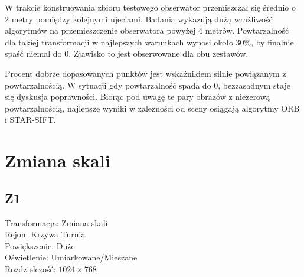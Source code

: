 W trakcie konstruowania zbioru testowego obserwator przemiszczał się średnio o 2 metry pomiędzy kolejnymi ujeciami. Badania wykazują dużą wrażliwość algorytmów na przemieszczenie obserwatora powyżej 4 metrów. Powtarzalność dla takiej transformacji w najlepszych warunkach wynosi około 30\%, by finalnie spaść niemal do 0. Zjawisko to jest obserwowane dla obu zestawów.

Procent dobrze dopasowanych punktów jest wskaźnikiem silnie powiązanym z powtarzalnością. W sytuacji gdy powtarzalność spada do 0, bezzasadnym staje się dyskusja poprawności. Biorąc pod uwagę te pary obrazów z niezerową powtarzalnością, najlepsze wyniki w zalezności od sceny osiągają algorytmy ORB i STAR-SIFT.

\FloatBarrier
\newpage
\section{Zmiana skali}
\subsection{Z1}
Transformacja: Zmiana skali\\
Rejon: Krzywa Turnia\\
Powiększenie: Duże\\
Oświetlenie: Umiarkowane/Mieszane\\
Rozdzielczość: $1024 \times 768$

